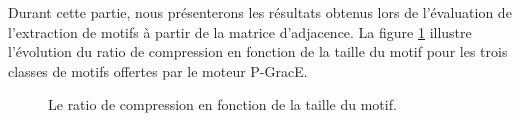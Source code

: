 	Durant cette partie, nous présenterons les résultats obtenus lors de l'évaluation de l'extraction de motifs à partir de la matrice d'adjacence. La figure \ref{fig:test-m} illustre l'évolution du ratio de compression en fonction de la taille du motif pour les trois classes de motifs offertes par le moteur P-GracE.
		\begin{figure}[H]
		\begin{center}
			\hspace{3em}
			\hspace{3em}
			\hspace{3em}
			
			\caption{Le ratio de compression en fonction de la taille du motif.}
			\label{fig:test-m}
		\end{center}
	\end{figure}
	
